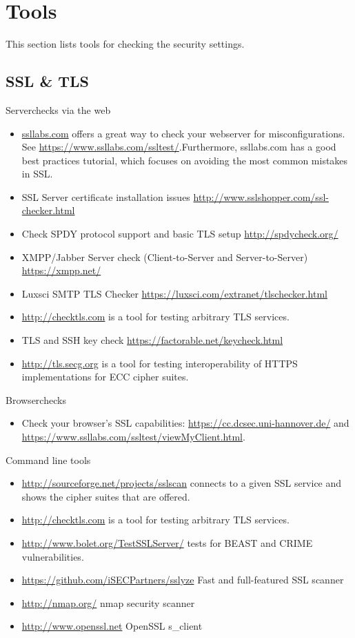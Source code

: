 \newpage
\section{Tools}
\label{section:Tools}
This section lists tools for checking the security settings.

\subsection{SSL \& TLS}

Serverchecks via the web
\begin{itemize}
\item \href{http://ssllabs.com}{ssllabs.com} offers a great way to check your webserver for misconfigurations. See \url{https://www.ssllabs.com/ssltest/}.Furthermore, ssllabs.com has a good best practices tutorial, which focuses on avoiding the most common mistakes in SSL.
\item SSL Server certificate installation issues \url{http://www.sslshopper.com/ssl-checker.html}
\item Check SPDY protocol support and basic TLS setup \url{http://spdycheck.org/}
\item XMPP/Jabber Server check (Client-to-Server and Server-to-Server) \url{https://xmpp.net/}
\item Luxsci SMTP TLS Checker \url{https://luxsci.com/extranet/tlschecker.html}
\item \url{http://checktls.com} is a tool for testing arbitrary TLS services.
\item TLS and SSH key check \url{https://factorable.net/keycheck.html}
\item \url{http://tls.secg.org} is a tool for testing interoperability of HTTPS implementations for ECC cipher suites.
\end{itemize}

Browserchecks
\begin{itemize}
\item Check your browser's SSL capabilities: \url{https://cc.dcsec.uni-hannover.de/} and \url{https://www.ssllabs.com/ssltest/viewMyClient.html}.
\end{itemize}


Command line tools
\begin{itemize}
\item \url{http://sourceforge.net/projects/sslscan} connects to a given SSL service and shows the cipher suites that are offered.
\item \url{http://checktls.com} is a tool for testing arbitrary TLS services. 
\item \url{http://www.bolet.org/TestSSLServer/} tests for BEAST and CRIME vulnerabilities.
\item \url{https://github.com/iSECPartners/sslyze} Fast and full-featured SSL scanner
\item \url{http://nmap.org/} nmap security scanner
\item \url{http://www.openssl.net} OpenSSL s\_client
\end{itemize}


